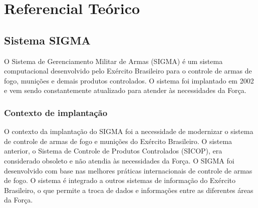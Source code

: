 
 
\chapter{Referencial Teórico}\label{referecial_teorico}
\section{Sistema SIGMA } 
O Sistema de Gerenciamento Militar de Armas (SIGMA) é um sistema computacional desenvolvido pelo Exército Brasileiro para o controle de armas de fogo, munições e demais produtos controlados. O sistema foi implantado em 2002 e vem sendo constantemente atualizado para atender às necessidades da Força.

\subsection{Contexto de implantação}
O contexto da implantação do SIGMA foi a necessidade de modernizar o sistema de controle de armas de fogo e munições do Exército Brasileiro. O sistema anterior, o Sistema de Controle de Produtos Controlados (SICOP), era considerado obsoleto e não atendia às necessidades da Força.
O SIGMA foi desenvolvido com base nas melhores práticas internacionais de controle de armas de fogo. O sistema é integrado a outros sistemas de informação do Exército Brasileiro, o que permite a troca de dados e informações entre as diferentes áreas da Força.\cite{ExércitoBrasileiro}

